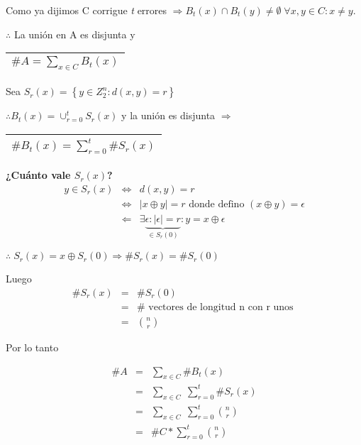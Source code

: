 \documentclass[12pt,a4paper]{report}
\newcounter{neq}
\begin{document}
		\vspace{3mm}
		Como ya dijimos C corrigue \textit{t} errores $\Rightarrow B_{t}(x) \cap B_{t}(y) \neq \emptyset \; \forall x, y \in C : x \neq y$.
		
		\begin{center}
		$\therefore$ La unión en A es disjunta y \begin{tabular}{|c|} \hline $ \#A = \sum_{x \in C} B_{t}(x) $ \\ \hline \end{tabular}
		\end{center}
		
		\vspace{3mm}
		Sea $S_{r}(x) = \left\lbrace y \in Z_{2}^{n} : d(x, y) = r \right\rbrace$
		
		\vspace{3mm}
		$\therefore B_{t}(x) = \cup_{r = 0}^{t}S_{r}(x)$ y la unión es disjunta $\Rightarrow$ \begin{tabular}{|c|} \hline $ \#B_{t}(x) = \sum_{r = 0}^{t}\#S_{r}(x) $ \\ \hline \end{tabular}
		
		\vspace{3mm}
		\textbf{¿Cuánto vale $S_{r}(x)$?}
		\begin{eqnarray}
			\nonumber y \in S_{r}(x) & \Leftrightarrow & d(x, y) = r \\
			\nonumber & \Leftrightarrow & \lvert x \oplus y \rvert = r \text{ donde defino } (x \oplus y) = \epsilon \\
			\nonumber & \Leftarrow & \exists \underbrace{\epsilon : \lvert \epsilon \rvert = r}_{\in S_{r}(0)} : y = x \oplus \epsilon
		\end{eqnarray}
		
		$\therefore \; S_{r}(x) = x \oplus S_{r}(0) \Rightarrow \#S_{r}(x) = \#S_{r}(0)$
		
		\vspace{3mm}
		Luego
		\begin{eqnarray}
			\nonumber \#S_{r}(x) &=& \#S_{r}(0) \\
			\nonumber &=& \# \text{ vectores de longitud n con r unos } \\
			\nonumber &=& {n \choose r} 
		\end{eqnarray}
		
		Por lo tanto
		
		\begin{eqnarray}
			\nonumber \# A &=& \sum_{x \in C} \# B_{t}(x) \\
			\nonumber &=& \sum_{x \in C} \; \sum_{r= 0}^{t} \#S_{r}(x) \\
			\nonumber &=& \sum_{x \in C} \; \sum_{r = 0}^{t} {n \choose r} \\
			\nonumber &=& \# C * \sum_{r = 0}^{t} {n \choose r}
		\end{eqnarray}
		
\end{document}
